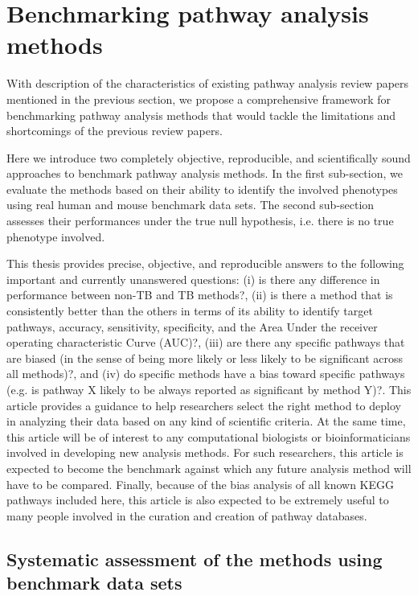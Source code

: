 \section{Benchmarking pathway analysis methods}

With description of the characteristics of existing pathway analysis review papers mentioned in the previous section, we propose a comprehensive framework for benchmarking pathway analysis methods that would tackle the limitations and shortcomings of the previous review papers.

Here we introduce two completely objective, reproducible, and scientifically sound approaches to benchmark pathway analysis methods. In the first sub-section, we evaluate the methods based on their ability to identify the involved phenotypes using real human and mouse benchmark data sets. The second sub-section assesses their performances under the true null hypothesis, i.e. there is no true phenotype involved.


This thesis provides precise, objective, and reproducible answers to the following important and currently unanswered questions: (i) is there any difference in performance between non-TB and TB methods?, (ii) is there a method that is consistently better than the others in terms of its ability to identify target pathways, accuracy, sensitivity, specificity, and the Area Under the receiver operating characteristic Curve (AUC)?, (iii) are there any specific pathways that are biased (in the sense of being more likely or less likely to be significant across all methods)?, and (iv) do specific methods have a bias toward specific pathways (e.g. is pathway X likely to be always reported as significant by method Y)?. 
This article provides a guidance to help researchers select the right method to deploy in analyzing their data based on any kind of scientific criteria. 
At the same time, this article will be of interest to any computational biologists or bioinformaticians involved in developing new analysis methods. 
For such researchers, this article is expected to become the benchmark against which any future analysis method will have to be compared. 
Finally, because of the bias analysis of all known KEGG pathways included here, this article is also expected to be extremely useful to many people involved in the curation and creation of pathway databases.


\subsection{Systematic assessment of the methods using benchmark data sets}

